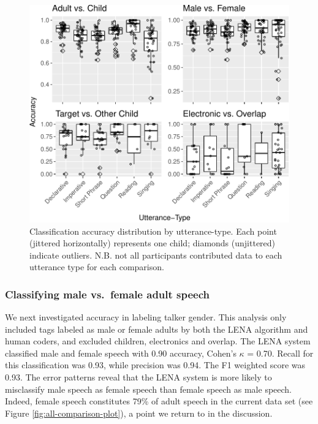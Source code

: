\documentclass[man,floatsintext]{apa6}
\theoremstyle{definition}
\theoremstyle{definition}
\theoremstyle{definition}
\theoremstyle{remark}
\begin{document}
\begin{figure}
\centering
\includegraphics{LTR_manuscript_files/figure-latex/utterance-type-plot-all-1.pdf}
\caption{\label{fig:utterance-type-plot-all}Classification accuracy
distribution by utterance-type. Each point (jittered horizontally)
represents one child; diamonds (unjittered) indicate outliers. N.B. not
all participants contributed data to each utterance type for each
comparison.}
\end{figure}

\hypertarget{classifying-male-vs.-female-adult-speech}{%
\subsubsection{Classifying male vs.~female adult
speech}\label{classifying-male-vs.-female-adult-speech}}

We next investigated accuracy in labeling talker gender. This analysis
only included tags labeled as male or female adults by both the LENA
algorithm and human coders, and excluded children, electronics and
overlap. The LENA system classified male and female speech with 0.90
accuracy, Cohen's \(\kappa\) = 0.70. Recall for this classification was
0.93, while precision was 0.94. The F1 weighted score was 0.93. The
error patterns reveal that the LENA system is more likely to misclassify
male speech as female speech than female speech as male speech. Indeed,
female speech constitutes 79\% of adult speech in the current data set
(see Figure \ref{fig:all-comparison-plot}), a point we return to in the
discussion.
\end{document}
